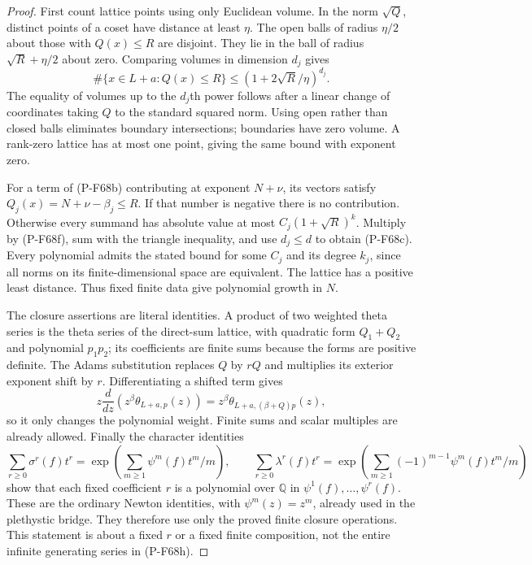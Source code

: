 \begin{proof}
First count lattice points using only Euclidean volume.  In the norm
$\sqrt Q$, distinct points of a coset have distance at least $\eta$.
The open balls of radius $\eta/2$ about those with $Q(x)\le R$ are
disjoint.  They lie in the ball of radius $\sqrt R+\eta/2$ about
zero.  Comparing volumes in dimension $d_j$ gives
\[
 \#\{x\in L+a:Q(x)\le R\}
              \le (1+2\sqrt R/\eta)^{d_j}.             \tag{P-F68f}
\]
The equality of volumes up to the $d_j$th power follows after a
linear change of coordinates taking $Q$ to the standard squared
norm.  Using open rather than closed balls eliminates boundary
intersections; boundaries have zero volume.  A rank-zero lattice
has at most one point, giving the same bound with exponent zero.

For a term of (P-F68b) contributing at exponent $N+\nu$, its vectors
satisfy $Q_j(x)=N+\nu-\beta_j\le R$.  If that number is negative
there is no contribution.  Otherwise every summand has absolute
value at most $C_j(1+\sqrt R)^k$.  Multiply by (P-F68f), sum with
the triangle inequality, and use $d_j\le d$ to obtain (P-F68c).
Every polynomial admits the stated bound for some $C_j$ and its
degree $k_j$, since all norms on its finite-dimensional space are
equivalent.  The lattice has a positive least distance.  Thus
fixed finite data give polynomial growth in $N$.

The closure assertions are literal identities.  A product of two
weighted theta series is the theta series of the direct-sum lattice,
with quadratic form $Q_1+Q_2$ and polynomial $p_1p_2$; its coefficients
are finite sums because the forms are positive definite.  The Adams
substitution replaces $Q$ by $rQ$ and multiplies its exterior exponent
shift by $r$.  Differentiating a shifted term gives
\[
 z\frac d{dz}\left(z^\beta\theta_{L+a,p}(z)\right)
       =z^\beta\theta_{L+a,(\beta+Q)p}(z),              \tag{P-F68g}
\]
so it only changes the polynomial weight.  Finite sums and scalar
multiples are already allowed.  Finally the character identities
\[
 \sum_{r\ge0}\sigma^r(f)t^r
   =\exp\left(\sum_{m\ge1}\psi^m(f)t^m/m\right),\qquad
 \sum_{r\ge0}\lambda^r(f)t^r
   =\exp\left(\sum_{m\ge1}(-1)^{m-1}\psi^m(f)t^m/m\right)
                                                        \tag{P-F68h}
\]
show that each fixed coefficient $r$ is a polynomial over $\mathbb Q$
in $\psi^1(f),\ldots,\psi^r(f)$.  These are the ordinary Newton
identities, with $\psi^m(z)=z^m$, already used in the plethystic
bridge.  They therefore use only the proved finite closure operations.
This statement is about a fixed $r$ or a fixed finite composition,
not the entire infinite generating series in (P-F68h).


\end{proof}
